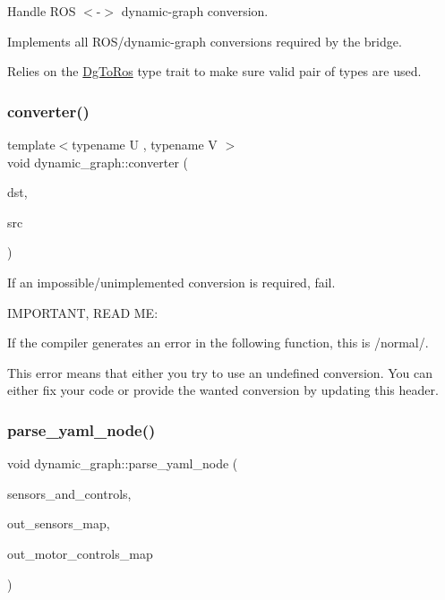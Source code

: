 Handle R\+OS $<$-\/$>$ dynamic-\/graph conversion. 

Implements all R\+O\+S/dynamic-\/graph conversions required by the bridge.

Relies on the \hyperlink{classdynamic__graph_1_1DgToRos}{Dg\+To\+Ros} type trait to make sure valid pair of types are used. \mbox{\label{namespacedynamic__graph_a38ff488b8b21c0b4f4d7f44572fa4ee5}} 
\subsubsection{\texorpdfstring{converter()}{converter()}\hspace{0.1cm}{\footnotesize\ttfamily [2/2]}}
{\footnotesize\ttfamily template$<$typename U , typename V $>$ \\
void dynamic\+\_\+graph\+::converter (\begin{DoxyParamCaption}\item[{U \&}]{dst,  }\item[{V \&}]{src }\end{DoxyParamCaption})\hspace{0.3cm}{\ttfamily [inline]}}



If an impossible/unimplemented conversion is required, fail. 

I\+M\+P\+O\+R\+T\+A\+NT, R\+E\+AD ME\+:

If the compiler generates an error in the following function, this is /normal/.

This error means that either you try to use an undefined conversion. You can either fix your code or provide the wanted conversion by updating this header. \mbox{\label{namespacedynamic__graph_a3473e2d5502f8a2bff6b43cbc2d35e07}} 
\subsubsection{\texorpdfstring{parse\+\_\+yaml\+\_\+node()}{parse\_yaml\_node()}}
{\footnotesize\ttfamily void dynamic\+\_\+graph\+::parse\+\_\+yaml\+\_\+node (\begin{DoxyParamCaption}\item[{const Y\+A\+M\+L\+::\+Node \&}]{sensors\+\_\+and\+\_\+controls,  }\item[{\hyperlink{namespacedynamic__graph_a51212ed7fa4ae81e7b362a27f09b7ab8}{Vector\+D\+G\+Map} \&}]{out\+\_\+sensors\+\_\+map,  }\item[{\hyperlink{namespacedynamic__graph_a51212ed7fa4ae81e7b362a27f09b7ab8}{Vector\+D\+G\+Map} \&}]{out\+\_\+motor\+\_\+controls\+\_\+map }\end{DoxyParamCaption})}



